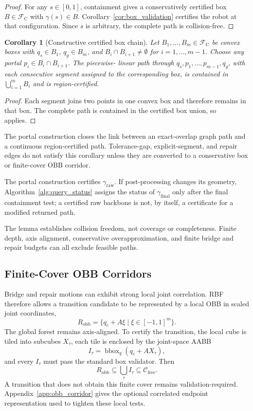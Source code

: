 \documentclass[journal]{IEEEtran}
\newtheorem{corollary}{Corollary}
\newcommand{\rbf}{RBF}
\newcommand{\Cfree}{\ensuremath{\mathcal{C}_{\mathrm{free}}}}
\newcommand{\gammaraw}{\ensuremath{\gamma_{\mathrm{raw}}}}
\newcommand{\gammafinal}{\ensuremath{\gamma_{\mathrm{final}}}}
\begin{document}
\begin{proof}
For any $s\in[0,1]$, containment gives a conservatively certified box
$B\in\mathcal{F}_{\mathrm C}$ with $\gamma(s)\in B$.
Corollary~\ref{cor:box_validation} certifies the robot at that configuration.
Since $s$ is arbitrary, the complete path is collision-free.
\end{proof}

\begin{corollary}[Constructive certified box chain]
\label{cor:constructive_box_chain}
Let $B_1,\ldots,B_m\in\mathcal{F}_{\mathrm C}$ be convex boxes with
$q_s\in B_1$, $q_g\in B_m$, and $B_i\cap B_{i+1}\neq\emptyset$ for
$i=1,\ldots,m-1$. Choose any portal $p_i\in B_i\cap B_{i+1}$. The piecewise-
linear path through $q_s,p_1,\ldots,p_{m-1},q_g$, with each consecutive segment
assigned to the corresponding box, is contained in
$\bigcup_{i=1}^{m}B_i$ and is region-certified.
\end{corollary}

\begin{proof}
Each segment joins two points in one convex box and therefore remains in that
box. The complete path is contained in the certified box union, so
 applies.
\end{proof}

The portal construction closes the link between an exact-overlap graph path and
a continuous region-certified path. Tolerance-gap, explicit-segment, and repair
edges do not satisfy this corollary unless they are converted to a conservative
box or finite-cover OBB corridor.

The portal construction certifies \gammaraw{}. If post-processing changes its
geometry, Algorithm~\ref{alg:query_status} assigns the status of
\gammafinal{} only after the final containment test; a certified raw backbone
is not, by itself, a certificate for a modified returned path.

The lemma establishes collision freedom, not coverage or completeness. Finite
depth, axis alignment, conservative overapproximation, and finite bridge and
repair budgets can all exclude feasible paths.

\subsection{Finite-Cover OBB Corridors}\label{sec:obb_endpoint_env}

Bridge and repair motions can exhibit strong local joint correlation. \rbf{}
therefore allows a transition candidate to be represented by a local OBB in
scaled joint coordinates,
\[
R_{\mathrm{obb}}=\{q_c+A\xi\mid \xi\in[-1,1]^{m}\}.
\]
The global forest remains axis-aligned. To certify the transition, the local
cube is tiled into subcubes $X_\tau$, each tile is enclosed by the joint-space
AABB
\[
I_\tau=\operatorname{bbox}_q(q_c+AX_\tau),
\]
and every $I_\tau$ must pass the standard box validator. Then
\[
R_{\mathrm{obb}}\subseteq\bigcup_\tau I_\tau\subseteq\Cfree.
\]
A transition that does not obtain this finite cover remains
validation-required. Appendix~\ref{app:obb_corridor} gives the optional
correlated endpoint representation used to tighten these local tests.
\end{document}
